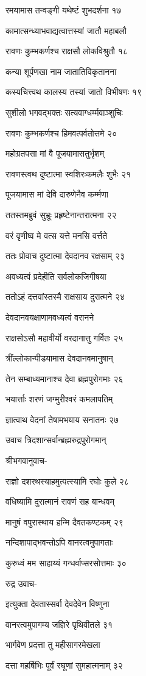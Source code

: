 रमयामास तन्वङ्गी यथेष्टं शुभदर्शना १७

कामात्सन्ध्याभवाद्यत्वात्तस्यां जातौ महाबलौ

रावणः कुम्भकर्णश्च राक्षसौ लोकविश्रुतौ १८

कन्या शूर्पणखा नाम जातातिविकृतानना

कस्यचित्त्वथ कालस्य तस्यां जातो विभीषणः १९

सुशीलो भगवद्भक्तः सत्यवाग्धर्म्मवाञ्शुचिः

रावणः कुम्भकर्णश्च हिमवत्पर्वतोत्तमे २०

महोग्रतपसा मां वै पूजयामासतुर्भृशम्

रावणस्त्वथ दुष्टात्मा स्वशिरःकमलैः शुभैः २१

पूजयामास मां देवि दारुणेनैव कर्म्मणा

ततस्तमब्रुवं सुभ्रूः प्रहृष्टेनान्तरात्मना २२

वरं वृणीष्व मे वत्स यत्ते मनसि वर्त्तते

ततः प्रोवाच दुष्टात्मा देवदानव रक्षसाम् २३

अवध्यत्वं प्रदेहीति सर्वलोकजिगीषया

ततोऽहं दत्तवांस्तस्मै राक्षसाय दुरात्मने २४

देवदानवयक्षाणामवध्यत्वं वरानने

राक्षसोऽसौ महावीर्यो वरदानात्तु गर्वितः २५

त्रींल्लोकान्पीडयामास देवदानवमानुषान्

तेन सम्बाध्यमानाश्च देवा ब्रह्मपुरोगमाः २६

भयार्त्ताः शरणं जग्मुरीश्वरं कमलापतिम्

ज्ञात्वाथ वेदनां तेषामभयाय सनातनः २७

उवाच त्रिदशान्सर्वान्ब्रह्मरुद्रपुरोगमान्

श्रीभगवानुवाच-

राज्ञो दशरथस्याहमुत्पत्स्यामि रघोः कुले २८

वधिष्यामि दुरात्मानं रावणं सह बान्धवम्

मानुषं वपुरास्थाय हन्मि दैवतकण्टकम् २९

नन्दिशापाद्भवन्तोऽपि वानरत्वमुपागताः

कुरुध्वं मम साहाय्यं गन्धर्वाप्सरसोत्तमाः ३०

रुद्र उवाच-

इत्युक्ता देवतास्सर्वा देवदेवेन विष्णुना

वानरत्वमुपागम्य जज्ञिरे पृथिवीतले ३१

भार्गवेण प्रदत्ता तु महीसागरमेखला

दत्ता महर्षिभिः पूर्वं रघूणां सुमहात्मनाम् ३२

